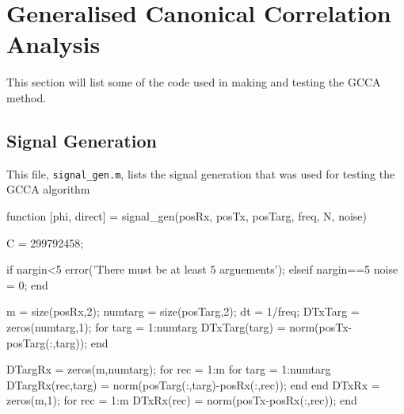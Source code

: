 \documentclass[12pt,openany,a4paper]{book}
\begin{document}
\section{Generalised Canonical Correlation Analysis}
This section will list some of the code used in making and testing the GCCA method.
\subsection{Signal Generation}
\label{app:siggen1}
This file, \verb+signal_gen.m+, lists the signal generation that was used for testing the GCCA algorithm
\begin{spverbatim}
function [phi, direct] = signal_gen(posRx, posTx, posTarg, freq, N, noise)
%
%
%

C = 299792458;

%

if nargin<5
    error('There must be at least 5 arguements');
elseif nargin==5
    noise = 0;
end

m = size(posRx,2);
numtarg = size(posTarg,2);
dt = 1/freq;
DTxTarg = zeros(numtarg,1);
for targ = 1:numtarg
    DTxTarg(targ) = norm(posTx-posTarg(:,targ));
end

DTargRx = zeros(m,numtarg);
for rec = 1:m
    for targ = 1:numtarg
        DTargRx(rec,targ) = norm(posTarg(:,targ)-posRx(:,rec));
    end
end
DTxRx = zeros(m,1);
for rec = 1:m
    DTxRx(rec) = norm(posTx-posRx(:,rec));
end


\end{spverbatim}
\end{document}

